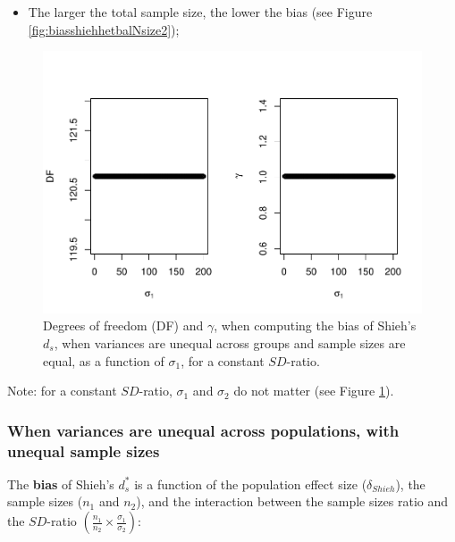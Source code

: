 \documentclass[
  english,
  man,mask]{apa6}
\providecommand{\tightlist}{%
  \setlength{\itemsep}{0pt}\setlength{\parskip}{0pt}}
\begin{document}
\begin{itemize}
\tightlist
\item
  The larger the total sample size, the lower the bias (see Figure \ref{fig:biasshiehhetbalNsize2});
\end{itemize}

\begin{figure}
\centering
\includegraphics{Theoretical-Bias-of-all-estimators-as-a-function-of-population-parameters_files/figure-latex/biasshiehhetbalvariance2-1.pdf}
\caption{\label{fig:biasshiehhetbalvariance2}Degrees of freedom (DF) and \(\gamma\), when computing the bias of Shieh's \(d_s\), when variances are unequal across groups and sample sizes are equal, as a function of \(\sigma_1\), for a constant \(SD\)-ratio.}
\end{figure}

Note: for a constant \(SD\)-ratio, \(\sigma_1\) and \(\sigma_2\) do not matter (see Figure \ref{fig:biasshiehhetbalvariance2}).

\hypertarget{when-variances-are-unequal-across-populations-with-unequal-sample-sizes-1}{%
\subsubsection{When variances are unequal across populations, with unequal sample sizes}\label{when-variances-are-unequal-across-populations-with-unequal-sample-sizes-1}}

The \textbf{bias} of Shieh's \(d^*_s\) is a function of the population effect size (\(\delta_{Shieh}\)), the sample sizes (\(n_1\) and \(n_2\)), and the interaction between the sample sizes ratio and the \(SD\)-ratio \(\left(\frac{n_1}{n_2}\times\frac{\sigma_1}{\sigma_2} \right)\):
\end{document}
